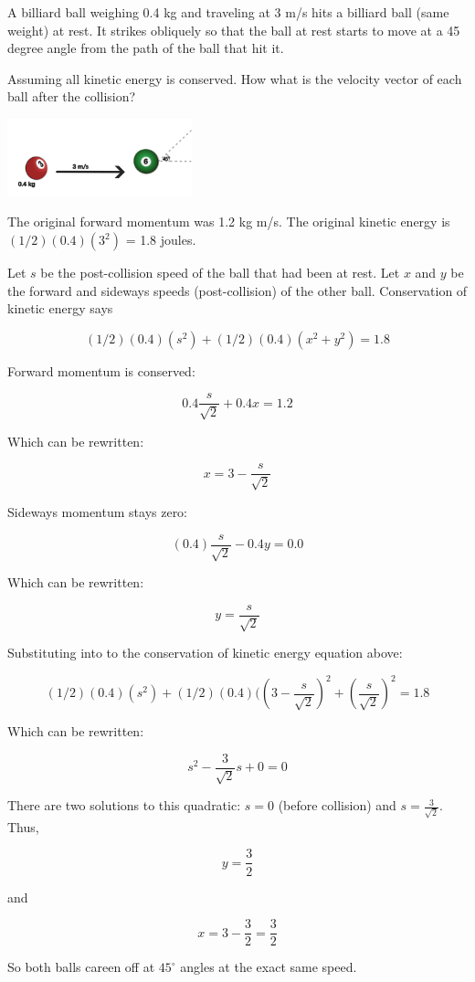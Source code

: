 \begin{Exercise}[title={Billiard Balls}, label=billiards]
  
A billiard ball weighing 0.4 kg and traveling at 3 m/s hits a billiard
ball (same weight) at rest. It strikes obliquely so that the ball at rest starts to
move at a 45 degree angle from the path of the ball that hit it.

Assuming all kinetic energy is conserved. How what is the velocity
vector of each ball after the collision?

\includegraphics[width=0.4\textwidth]{billiards.png}

\end{Exercise}
\begin{Answer}[ref=billiards]

  The original forward momentum was 1.2 kg m/s.  The original kinetic energy is $(1/2)(0.4)(3^2)$ = 1.8 joules. 

  Let $s$ be the post-collision speed of the ball that had been at
  rest.  Let $x$ and $y$ be the forward and sideways speeds
  (post-collision) of the other ball. Conservation of kinetic energy says

  $$(1/2)(0.4)(s^2) + (1/2)(0.4)(x^2+y^2) = 1.8$$

  Forward momentum is conserved:

  $$0.4\frac{s}{\sqrt{2}} + 0.4 x = 1.2$$

  Which can be rewritten:

  $$x = 3 - \frac{s}{\sqrt{2}}$$
  
  Sideways momentum stays zero:

  $$(0.4)\frac{s}{\sqrt{2}} - 0.4 y = 0.0$$

  Which can be rewritten:

  $$y = \frac{s}{\sqrt{2}}$$

  Substituting into to the conservation of kinetic energy equation above:

  $$(1/2)(0.4)(s^2) + (1/2)(0.4)(\left(3 - \frac{s}{\sqrt{2}}\right)^2+\left(\frac{s}{\sqrt{2}}\right)^2 = 1.8$$

  Which can be rewritten:

  $$s^2 - \frac{3}{\sqrt{2}} s + 0 = 0$$

  There are two solutions to this quadratic: $s = 0$ (before collision) and $s = \frac{3}{\sqrt{2}}$. Thus,

  $$y = \frac{3}{2}$$

  and

  $$x = 3 - \frac{3}{2} = \frac{3}{2}$$

  So both balls careen off at $45^\circ$ angles at the exact same speed. 

  
\end{Answer}



